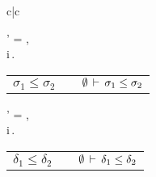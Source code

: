 \begin{figure*}[ht]
\begin{center}
  \begin{tabular}{c|c}

  \begin{minipage}{.55\textwidth}

    \begin{center}
    \end{center}

    \infrule
      {
         \andalso \Delta' = \Delta,  \\
        \andalso
           \forall i\,.\;
      }
      {}


    \begin{tabularx}{\textwidth}{RcX}
    $\sigma_1 \le \sigma_2$ &
      \syndef &
      $\jqsub[\emptyset]{\sigma_1}{\sigma_2}$ \\
    \end{tabularx}

    \begin{center}
    \end{center}
    \infrule
      {
         \andalso \Delta' = \Delta,  \\
          \andalso \forall i\,.\;
          }
      {}
    \begin{tabularx}{\textwidth}{RcX}
    $\delta_1 \le \delta_2$ & \syndef & $\jqsub[\emptyset]{\delta_1}{\delta_2}$
    \end{tabularx}
  \end{minipage}


\end{tabular}
\end{center}
\end{figure*}
